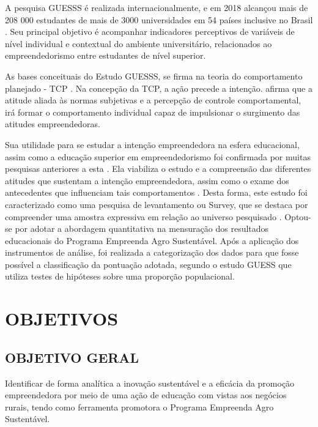 A pesquisa GUESSS é realizada internacionalmente, e em 2018 alcançou mais de 208 000 estudantes de mais de 3000 universidades em 54 países inclusive no Brasil \cite{sieger_global_2018}. Seu principal objetivo é acompanhar indicadores perceptivos de variáveis de nível individual e contextual do ambiente universitário, relacionados ao empreendedorismo entre estudantes de nível superior.

As bases conceituais do Estudo GUESSS, se firma na teoria do comportamento planejado - TCP \cite{ajzen_perceived_2002}. Na concepção da TCP, a ação precede a intenção.  afirma que a atitude aliada às normas subjetivas e a percepção de controle comportamental, irá formar o comportamento individual capaz de impulsionar o surgimento das atitudes empreendedoras.

Sua utilidade para se estudar a intenção empreendedora na esfera educacional, assim como a educação superior em empreendedorismo foi confirmada por muitas pesquisas anteriores a esta \cite{krueger_potencial_2018,gonzalez_predictors_2009,fayolle_effect_2006}. Ela viabiliza o estudo e a compreensão das diferentes atitudes que sustentam a intenção empreendedora, assim como o exame dos antecedentes que influenciam tais comportamentos \cite{lima_educacao_2014}. Desta forma, este estudo foi caracterizado como uma pesquisa de levantamento ou Survey, que se destaca por compreender uma amostra expressiva em relação ao universo pesquisado \cite{freitas_o_2000}. Optou-se por adotar a abordagem quantitativa na mensuração dos resultados educacionais do Programa Empreenda Agro Sustentável. Após a aplicação dos instrumentos de análise, foi realizada a categorização dos dados para que fosse possível a classificação da pontuação adotada, segundo o estudo GUESS \cite{meoli_how_2019} que utiliza testes de hipóteses sobre uma proporção populacional. 


\newpage

\section{OBJETIVOS}

\subsection{OBJETIVO GERAL}

Identificar de forma analítica a inovação sustentável e a eficácia da promoção empreendedora por meio de uma ação de educação com vistas aos negócios rurais, tendo como ferramenta promotora o Programa Empreenda Agro Sustentável.

